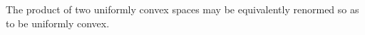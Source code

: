 The product of two uniformly convex spaces may be equivalently renormed so as to be uniformly convex.
